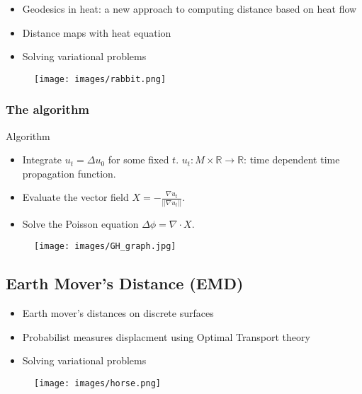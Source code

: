 \documentclass{beamer}
\begin{document}
\begin{frame}	
	\begin{itemize}
		\item Geodesics in heat: a new approach to computing distance based on
		heat flow \cite{DBLP:journals/tog/CraneWW13}
		\item Distance maps with heat equation
		\item Solving variational problems
	\end{itemize}
	
	\begin{figure}
		\texttt{[image: images/rabbit.png]}
		\vspace{-25px}
		\caption{\cite{DBLP:journals/tog/CraneWW13}}
	\end{figure}
\end{frame} 

\begin{frame}
	\frametitle{The algorithm}
	
	\begin{block}{Algorithm}
		\begin{itemize}
			\item Integrate $u_t=\Delta u_0$ for some fixed $t$. $u_t : M\times\mathbb{R}\rightarrow\mathbb{R}$: time dependent time propagation function.
			\item Evaluate the vector field $X = \displaystyle - \frac{\nabla u_t}{||\nabla u_t||}$.
			\item Solve the Poisson equation $\Delta\phi = \nabla \cdot X$.
		\end{itemize}
	\end{block}
	
	\begin{figure}[ht!]
		\centering
		\texttt{[image: images/GH\_graph.jpg]}
		\caption{\cite{DBLP:journals/tog/CraneWW13} }
	\end{figure}
\end{frame}

\subsection{Earth Mover's Distance (EMD)}

\begin{frame}	
	\begin{itemize}
		\item Earth mover's distances on discrete surfaces \cite{DBLP:journals/tog/SolomonRGB14}
		\item Probabilist measures displacment using Optimal Transport theory
		\item Solving variational problems
	\end{itemize}
	
		\begin{figure}
			\texttt{[image: images/horse.png]}
			\caption{\cite{DBLP:journals/tog/SolomonRGB14}}
		\end{figure}
\end{frame} 
\end{document}
